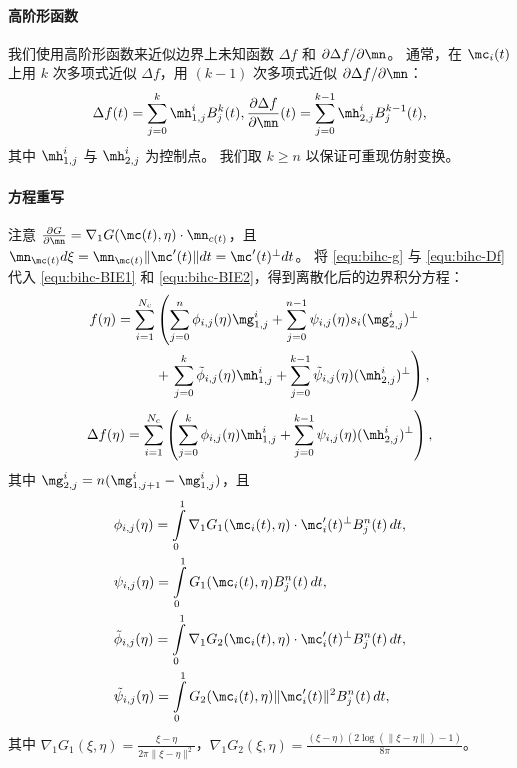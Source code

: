 \paragraph{高阶形函数}
我们使用高阶形函数来近似边界上未知函数 \(\Delta f\) 和 \(\partial \Delta f/\partial \mn\)。
通常，在 \(\mc_i(t)\) 上用 $k$ 次多项式近似 \(\Delta f\)，用 $(k-1)$ 次多项式近似 \(\partial \Delta f/\partial \mn\)：
\begin{equation}\label{equ:bihc-Df}
\begin{aligned}
    \Delta f(t)=\sum_{j=0}^k \mh_{1,j}^i B_j^k(t), \frac{\partial \Delta f}{\partial \mn}(t)=\sum_{j=0}^{k-1} \mh_{2,j}^i B_j^{k-1}(t),
    \end{aligned}
\end{equation}
其中 \(\mh_{1,j}^i\) 与 \(\mh_{2,j}^i\) 为控制点。
我们取 \(k \geq n\) 以保证可重现仿射变换。

\paragraph{方程重写}
注意 $\frac{\partial G}{\partial \mn}=\nabla_1 G(\mc(t),\eta)\cdot \mn_{c(t)}$，且 $\mn_{\mc(t)} d\xi=\mn_{\mc(t)}\|\mc'(t)\|dt=\mc'(t)^{\perp}dt$。
将 \eqref{equ:bihc-g} 与 \eqref{equ:bihc-Df} 代入 \eqref{equ:bihc-BIE1} 和 \eqref{equ:bihc-BIE2}，得到离散化后的边界积分方程：
\begin{equation}\label{equ:bihc-dis_Int1}
\begin{aligned}
    f(\eta) = \sum_{i=1}^{N_c} &\left(\sum_{j =0}^n \phi_{i,j}(\eta) \mg_{1,j}^i +  \sum_{j =0}^{n-1}\psi_{i,j}(\eta) s_i (\mg_{2,j}^{i})^{\perp} \right.\\
&+\left. \sum_{j =0}^k \tilde{\phi}_{i,j}(\eta) \mh_{1,j}^i +  \sum_{j =0}^{k-1}\tilde{\psi}_{i,j}(\eta) (\mh_{2,j}^{i})^{\perp}\right),
\end{aligned}
\end{equation}
\begin{equation}\label{equ:bihc-dis_Int2}
   \Delta f(\eta) = \sum_{i=1}^{N_c} \left(\sum_{j =0}^k  \phi_{i,j}(\eta) \mh_{1,j}^i + \sum_{j =0}^{k-1} \psi_{i,j}(\eta) (\mh_{2,j}^{i})^{\perp}\right),
\end{equation}
其中 $\mg_{2,j}^i=n(\mg_{1,j+1}^i-\mg_{1,j}^i)$，且
\begin{equation}\label{equ:bihc-basis_inte}
\begin{aligned}
   & \phi_{i,j}(\eta)=\int\limits_0^1\nabla_1 G_1(\mc_i(t),\eta)\cdot \mc_i'(t)^{\perp}B^n_j(t)\,dt,\\
   &\psi_{i,j}(\eta)=\int\limits_0^1 G_1(\mc_i(t),\eta) B^n_j(t)\,dt,\\
   &\tilde{\phi}_{i,j}(\eta)=\int\limits_0^1\nabla_1 G_2(\mc_i(t),\eta)\cdot \mc_i'(t)^{\perp}B^n_j(t)\,dt,\\
   &\tilde{\psi}_{i,j}(\eta)=\int\limits_0^1 G_2(\mc_i(t),\eta) \|\mc_i'(t)\|^2 B^n_j(t)\,dt,
 \end{aligned}
\end{equation}
其中 $\nabla_1 G_1(\xi, \eta) = \frac{\xi - \eta}{2\pi \|\xi - \eta\|^2}$，$\nabla_1 G_2(\xi, \eta) = \frac{(\xi - \eta)(2 \log(\|\xi-\eta\|)-1)}{8\pi}$。
%
